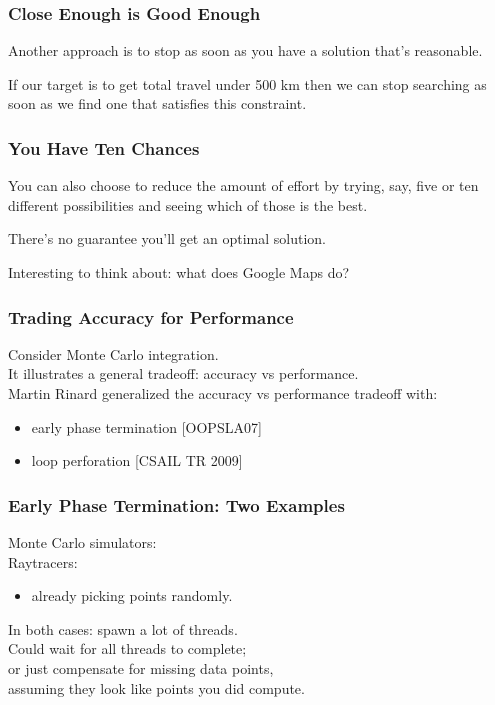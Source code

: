 \begin{frame}
\frametitle{Close Enough is Good Enough}

Another approach is to stop as soon as you have a solution that's reasonable. 

If our target is to get total travel under 500 km then we can stop searching as soon as we find one that satisfies this constraint.

\end{frame}

\begin{frame}
\frametitle{You Have Ten Chances}

You can also choose to reduce the amount of effort by trying, say, five or ten different possibilities and seeing which of those is the best.

There's no guarantee you'll get an optimal solution.

Interesting to think about: what does Google Maps do?

\end{frame}

\begin{frame}
  \frametitle{Trading Accuracy for Performance}


    Consider Monte Carlo integration.\\
    It illustrates a general tradeoff: accuracy vs performance.\\
  
    Martin Rinard generalized the accuracy vs performance tradeoff with:
      \begin{itemize}
        \item early phase termination [OOPSLA07]
        \item loop perforation [CSAIL TR 2009]
      \end{itemize}

\end{frame}



\begin{frame}
  \frametitle{Early Phase Termination: Two Examples}



Monte Carlo simulators: \\
Raytracers:
\begin{itemize}
\item already picking points randomly.
\end{itemize}

In both cases: spawn a lot of threads.\\[1em]
Could wait for all threads to complete;\\
or just compensate for missing data points,\\
assuming they look like points you did compute.


\end{frame}



